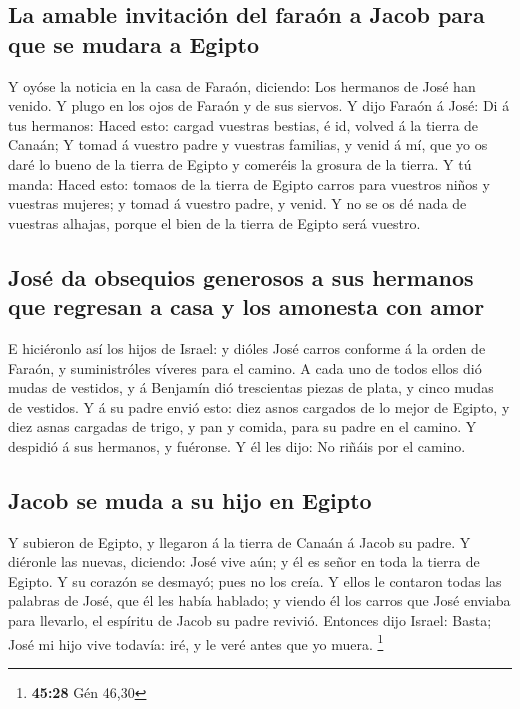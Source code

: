 \hypertarget{la-amable-invitaciuxf3n-del-farauxf3n-a-jacob-para-que-se-mudara-a-egipto}{%
\subsection{La amable invitación del faraón a Jacob para que se mudara a
Egipto}\label{la-amable-invitaciuxf3n-del-farauxf3n-a-jacob-para-que-se-mudara-a-egipto}}

 Y oyóse la noticia en la casa de Faraón, diciendo: Los
hermanos de José han venido. Y plugo en los ojos de Faraón y de sus
siervos.  Y dijo Faraón á José: Di á tus hermanos: Haced
esto: cargad vuestras bestias, é id, volved á la tierra de Canaán;
 Y tomad á vuestro padre y vuestras familias, y venid á mí,
que yo os daré lo bueno de la tierra de Egipto y comeréis la grosura de
la tierra.  Y tú manda: Haced esto: tomaos de la tierra de
Egipto carros para vuestros niños y vuestras mujeres; y tomad á vuestro
padre, y venid.  Y no se os dé nada de vuestras alhajas,
porque el bien de la tierra de Egipto será vuestro.

\hypertarget{josuxe9-da-obsequios-generosos-a-sus-hermanos-que-regresan-a-casa-y-los-amonesta-con-amor}{%
\subsection{José da obsequios generosos a sus hermanos que regresan a
casa y los amonesta con
amor}\label{josuxe9-da-obsequios-generosos-a-sus-hermanos-que-regresan-a-casa-y-los-amonesta-con-amor}}

 E hiciéronlo así los hijos de Israel: y dióles José carros
conforme á la orden de Faraón, y suministróles víveres para el camino.
 A cada uno de todos ellos dió mudas de vestidos, y á
Benjamín dió trescientas piezas de plata, y cinco mudas de vestidos.
 Y á su padre envió esto: diez asnos cargados de lo mejor
de Egipto, y diez asnas cargadas de trigo, y pan y comida, para su padre
en el camino.  Y despidió á sus hermanos, y fuéronse. Y él
les dijo: No riñáis por el camino.

\hypertarget{jacob-se-muda-a-su-hijo-en-egipto}{%
\subsection{Jacob se muda a su hijo en
Egipto}\label{jacob-se-muda-a-su-hijo-en-egipto}}

 Y subieron de Egipto, y llegaron á la tierra de Canaán á
Jacob su padre.  Y diéronle las nuevas, diciendo: José vive
aún; y él es señor en toda la tierra de Egipto. Y su corazón se desmayó;
pues no los creía.  Y ellos le contaron todas las palabras
de José, que él les había hablado; y viendo él los carros que José
enviaba para llevarlo, el espíritu de Jacob su padre revivió.
 Entonces dijo Israel: Basta; José mi hijo vive todavía:
iré, y le veré antes que yo muera. \footnote{\textbf{45:28} Gén 46,30}

